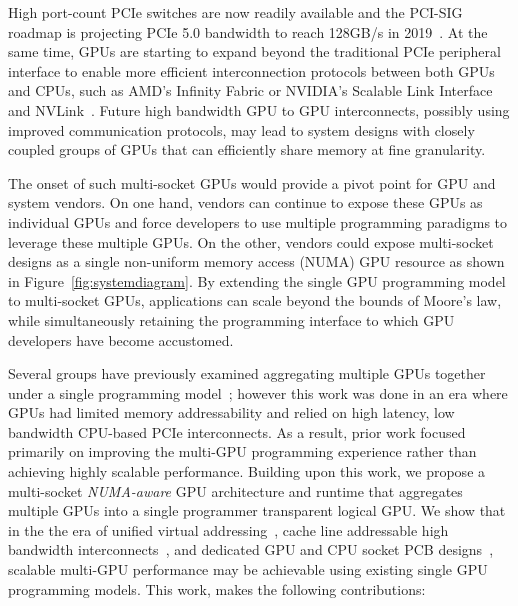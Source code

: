 High port-count PCIe switches are now readily available
and the PCI-SIG roadmap is projecting PCIe 5.0 bandwidth 
to reach 128GB/s in 2019~\cite{PCIeSwitches}. At the same time, GPUs are starting to expand 
beyond the traditional PCIe peripheral interface to enable more efficient interconnection
protocols between both GPUs and CPUs, such as AMD's Infinity Fabric or NVIDIA's Scalable Link Interface
and NVLink~\cite{dgx,SierraHPC,AMDINFINITYFABRIC,NVLINK,NVIDIASLI}.
Future high bandwidth GPU to GPU interconnects, possibly using
improved communication protocols, may lead to system designs with closely coupled
groups of GPUs that can efficiently share memory at fine granularity.

The onset of such multi-socket GPUs would provide a pivot point for GPU and system 
vendors. On one hand, vendors can continue to expose these GPUs as 
individual GPUs and force developers to use multiple
programming paradigms to 
leverage these multiple GPUs. On the other, vendors could expose multi-socket 
designs as a single non-uniform memory access (NUMA) GPU resource as shown in Figure~\ref{fig:systemdiagram}.  
By extending the single GPU programming model to multi-socket GPUs,  applications 
can scale beyond the bounds of Moore's law, while simultaneously retaining the 
programming interface to which GPU developers have become accustomed.

Several groups have previously examined aggregating multiple GPUs together under 
a single programming model~\cite{lee2013transparent,Cabezas2015}; however this 
work was done in an era where GPUs had limited memory addressability and relied 
on high latency, low bandwidth CPU-based PCIe interconnects. As a result, prior work 
focused primarily on improving the multi-GPU programming experience rather than 
achieving highly scalable performance. Building upon this work, we propose a 
multi-socket \textit{NUMA-aware} GPU architecture and runtime that aggregates 
multiple GPUs into a single programmer transparent logical GPU. We show that in 
the the era of unified virtual addressing~\cite{UVM}, cache line addressable 
high bandwidth interconnects~\cite{NVLINK}, and dedicated GPU and CPU socket PCB 
designs~\cite{SierraHPC}, scalable multi-GPU performance may be achievable using 
existing single GPU programming models. This work, makes the following 
contributions:

